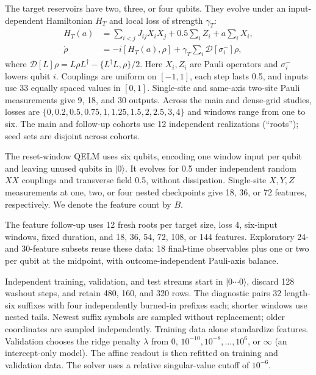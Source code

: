 The target reservoirs have two, three, or four qubits. They evolve under
an input-dependent Hamiltonian $H_T$ and local loss of strength $\gamma_T$:
\begin{align}
 H_T(a)&=\sum_{i<j}J_{ij}X_iX_j+0.5\sum_i Z_i+a\sum_iX_i,\nonumber\\
 \dot\rho&=-i[H_T(a),\rho]+\gamma_T\sum_i\mathcal D[\sigma_i^-]\rho,
 \label{eq:target-qrc-model}
\end{align}
where $\mathcal D[L]\rho=L\rho L^\dagger-\{L^\dagger L,\rho\}/2$.
Here $X_i,Z_i$ are Pauli operators and $\sigma_i^-$ lowers qubit $i$.
Couplings are uniform on $[-1,1]$, each step lasts 0.5, and inputs use
33 equally spaced values in $[0,1]$. Single-site and same-axis two-site
Pauli measurements give 9, 18, and 30 outputs. Across the main and
dense-grid studies, losses are
$\{0,0.2,0.5,0.75,1,1.25,1.5,2,2.5,3,4\}$ and windows range from one
to six. The main and follow-up cohorts use 12 independent realizations
(``roots''); seed sets are disjoint across cohorts.

The reset-window QELM uses six qubits, encoding one window input per
qubit and leaving unused qubits in $|0\rangle$. It evolves for 0.5 under
independent random $XX$ couplings and transverse field 0.5, without
dissipation. Single-site $X,Y,Z$ measurements at one, two, or four nested
checkpoints give 18, 36, or 72 features, respectively. We denote the
feature count by $B$.

The feature follow-up uses 12 fresh roots per target size, loss 4,
six-input windows, fixed duration, and 18, 36, 54, 72, 108, or 144 features.
Exploratory 24- and 30-feature subsets reuse these data: 18 final-time
observables plus one or two per qubit at the midpoint, with
outcome-independent Pauli-axis balance.

Independent training, validation, and test streams start in
$|0\cdots0\rangle$, discard 128 washout steps, and retain
480, 160, and 320 rows. The diagnostic pairs 32 length-six suffixes with
four independently burned-in prefixes each; shorter windows use nested
tails. Newest suffix symbols are sampled without replacement; older
coordinates are sampled independently. Training data alone standardize
features. Validation chooses the ridge penalty $\lambda$ from 0,
$10^{-10},10^{-8},\ldots,10^6$, or $\infty$ (an intercept-only model).
The affine readout is then refitted on training and validation data.
The solver uses a relative singular-value cutoff of $10^{-6}$.

